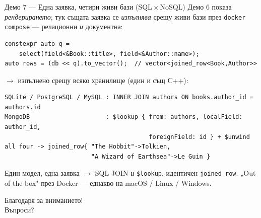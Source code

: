 \documentclass[aspectratio=169,12pt]{beamer}
\begin{document}
\begin{frame}[fragile]{Демо 7 — Една заявка, четири живи бази (SQL\,$\times$\,NoSQL)}
    {\footnotesize Демо 6 показа \emph{рендерирането}; тук същата заявка се \emph{изпълнява}
    срещу живи бази през \texttt{docker compose} --- релационни \emph{и} документна:}
\begin{lstlisting}[basicstyle=\footnotesize\ttfamily]
constexpr auto q =
    select(field<&Book::title>, field<&Author::name>);
auto rows = (db << q).to_vector();  // vector<joined_row<Book,Author>>
\end{lstlisting}
    {\scriptsize $\rightarrow$ изпълнено срещу всяко хранилище (един и същ C++):}
\begin{lstlisting}[basicstyle=\scriptsize\ttfamily,breaklines=true,keywordstyle=\color{black},stringstyle=\color{black},commentstyle=\color{cppgray}]
SQLite / PostgreSQL / MySQL : INNER JOIN authors ON books.author_id = authors.id
MongoDB                     : $lookup { from: authors, localField: author_id,
                                        foreignField: id } + $unwind
all four -> joined_row{ "The Hobbit"->Tolkien,
                        "A Wizard of Earthsea"->Le Guin }
\end{lstlisting}
    {\scriptsize Един модел, една заявка $\rightarrow$ SQL JOIN \emph{и} \texttt{\$lookup},
    идентичен \texttt{joined\_row}. „Out of the box" през Docker --- еднакво на
    macOS / Linux / Windows.}
\end{frame}

\begin{frame}[plain]
    \vfill
    \centering
    {\Large\color{tusofia} Благодаря за вниманието!}\\[0.6em]
    {\large Въпроси?}
    \vfill
\end{frame}

\appendix
\end{document}
